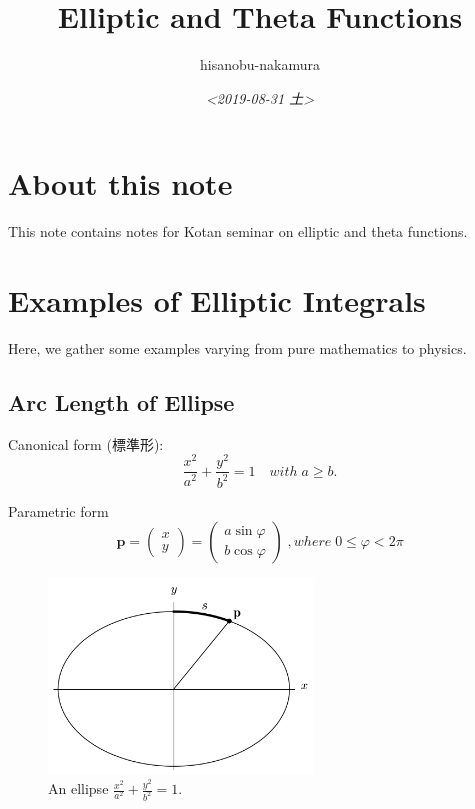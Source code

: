 \documentclass{article}
\author{hisanobu-nakamura}
\date{\textit{<2019-08-31 土>}}
\title{Elliptic and Theta Functions}
\begin{document}
\maketitle
\tableofcontents


\section{About this note}
\label{sec-1}
This note contains notes for Kotan seminar on elliptic and theta functions.

\section{Examples of Elliptic Integrals}
\label{sec-2}
Here, we gather some examples varying from pure mathematics to physics.
\subsection{Arc Length of Ellipse}
\label{sec-2-1}
Canonical form (標準形):
\begin{equation}
\frac{x^{2}}{a^{2}} +\frac{y^{2}}{b^{2}}=1 \quad with \; a \ge b.
\end{equation}

Parametric form
\begin{equation}
\mathbf{p} =\left(
\begin{array}{c}
 x \\
 y
\end{array} \right)
=\left(
\begin{array}{c}
 a \sin{\varphi} \\
 b \cos{\varphi}
\end{array} \right)
\;, where \; 0 \le \varphi < 2 \pi
\end{equation}

\begin{figure}[htb]
\centering
\includegraphics[width=70mm]{./ellipse_generic.png}
\caption{\label{fig:generic_ellipse}An ellipse $\frac{x^{2}}{a^{2}} +\frac{y^{2}}{b^{2}}=1$.}
\end{figure} \\
\end{document}

